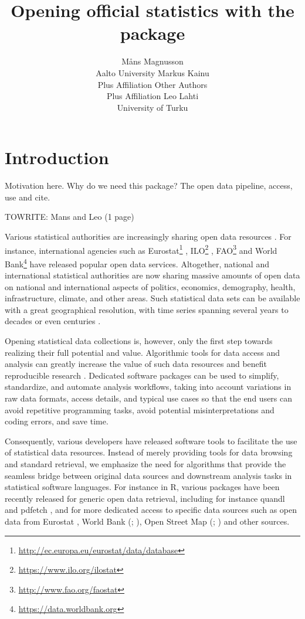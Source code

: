 \documentclass[article]{jss}
\author{M\r{a}ns Magnusson\\Aalto University \And 
        Markus Kainu\\Plus Affiliation  \And 
        Other Authors\\Plus Affiliation  \And
        Leo Lahti\\University of Turku}
\title{Opening  official statistics with the \pkg{pxweb} package}
\begin{document}


\section[Introduction]{Introduction}

Motivation here. Why do we need this package? The open data pipeline, access, use and cite.

TOWRITE: Mans and Leo (1 page)

Various statistical authorities are increasingly sharing open data resources \cite{xxx}. For instance, international agencies such as Eurostat\footnote{\url{http://ec.europa.eu/eurostat/data/database}} \cite{xxx}, ILO\footnote{\url{https://www.ilo.org/ilostat}} \cite{xxx} , FAO\footnote{\url{http://www.fao.org/faostat}} \cite{xxx} and World Bank\footnote{\url{https://data.worldbank.org}} \cite{xxx} have released popular open data services. Altogether, national and international statistical authorities are now sharing massive amounts of open data on national and international aspects of politics, economics, demography, health, infrastructure, climate, and other areas. Such statistical data sets can be available with a great geographical resolution, with time series spanning several years to decades or even centuries \cite{xxx}.

Opening statistical data collections is, however, only the first step towards realizing their full potential and value. Algorithmic tools for data access and analysis can greatly increase the value of such data resources and benefit reproducible research \citep{Gandrud13, Boettiger2015}. Dedicated software packages can be used to simplify, standardize, and automate analysis workflows, taking into account variations in raw data formats, access details, and typical use cases so that the end users can avoid  repetitive programming tasks, avoid potential misinterpretations and coding errors, and save time. 

Consequently, various developers have released software tools to facilitate the use of statistical data resources. Instead of merely providing tools for data browsing and standard retrieval, we emphasize the need for algorithms that provide the seamless bridge between original data sources and downstream analysis tasks in statistical software languages. For instance in R, various packages have been recently released for generic open data retrieval, including for instance quandl \cite{quandl} and pdfetch \cite{pdfetch}, and for more dedicated access to specific data sources such as open data from Eurostat \cite{Lahti17eurostat}, World Bank (; \citealt{WDI}), Open Street Map (; \citealt{osmar}) and other sources.
\end{document}
